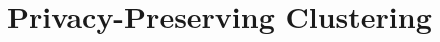 %

\chapter{Privacy-Preserving Clustering}
\label{chapter:kmeans}






%

\begin{comment}

 

\appendix

\end{comment}
\begin{comment}



\end{comment}


